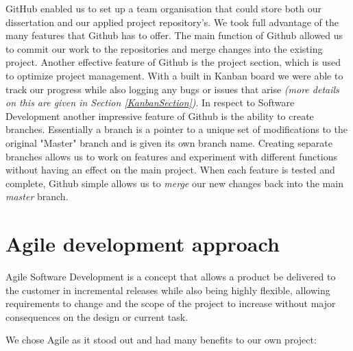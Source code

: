 GitHub enabled us to set up a team organisation that could store both our dissertation and our applied project repository's. We took full advantage of the many features that Github has to offer. The main function of Github allowed us to commit our work to the repositories and merge changes into the existing project. Another effective feature of Github is the project section, which is used to optimize project management. With a built in Kanban board we were able to track our progress while also logging any bugs or issues that arise \textit{(more details on this are given in Section \ref{KanbanSection})}. In respect to Software Development another impressive feature of Github is the ability to create branches. Essentially a branch is a pointer to a unique set of modifications to the original "Master" branch and is given its own branch name. Creating separate branches allows us to work on features and experiment with different functions without having an effect on the main project. When each feature is tested and complete, Github simple allows us to \textit{merge} our new changes back into the main \textit{master} branch.

\section{Agile development approach}
Agile Software Development is a concept that allows a product be delivered to the customer in incremental releases while also being highly flexible, allowing requirements to change and the scope of the project to increase without major consequences on the design or current task\cite{agile}.

We chose Agile as it stood out and had many benefits to our own project:

